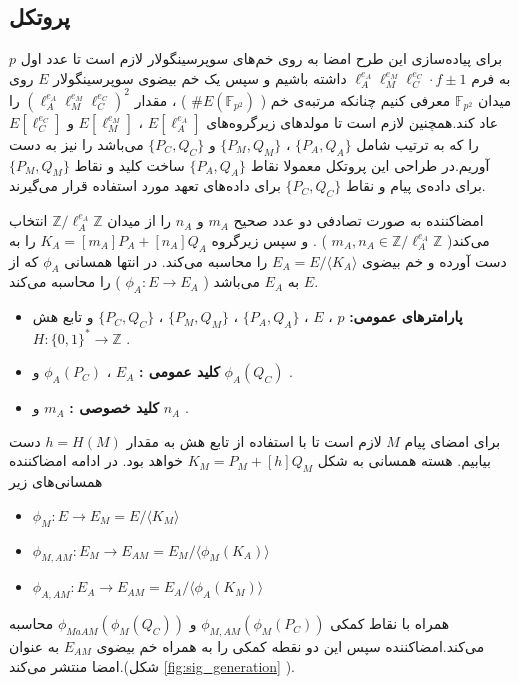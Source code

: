 \documentclass[12pt,a4paper]{article}
\begin{document}
\subsection{پروتکل}

برای پیاده‌سازی این طرح امضا به روی خم‌های سوپرسینگولار لازم است تا عدد اول 
$p$
 به فرم 
 $\ell_A^{e_A} \ell_M^{e_M} \ell_C^{e_C} \cdot f \pm 1$
داشته باشیم و سپس یک خم بیضوی سوپرسینگولار 
$E$
روی میدان
$\mathbb{F}_{p^2}$
معرفی کنیم چنانکه مرتبه‌ی خم (
$\# E(\mathbb{F}_{p^2})$
)
، مقدار
$(\ell_A^{e_A} \ell_M^{e_M} \ell_C^{e_C})^2$
را عاد کند.همچنین لازم است تا مولدهای زیرگروه‌های 
$E[\ell_A^{e_A}]$
،
$E[\ell_M^{e_M}]$
و
$E[\ell_C^{e_C}]$
را که به ترتیب شامل
$\{ P_A,Q_A\}$
،
$\{P_M,Q_M\}$
و
$\{P_C,Q_C\}$
می‌باشد را نیز به دست آوریم.در طراحی این پروتکل معمولا نقاط
$\{ P_A,Q_A\}$
ساخت کلید و نقاط
$\{P_M,Q_M\}$
برای داده‌ی پیام و نقاط
$\{P_C,Q_C\}$
برای داده‌های تعهد مورد استفاده قرار می‌گیرند.

امضاکننده به صورت تصادفی دو عدد صحیح
$m_A$
و
$n_A$
را از میدان
$\mathbb{Z} / \ell_A^{e_A} \mathbb{Z}$
انتخاب می‌کند(
$m_A,n_A \in \mathbb{Z} / \ell_A^{e_A} \mathbb{Z}$
)
. و سپس زیرگروه
$K_A = [m_A]P_A + [n_A]Q_A$
را به دست آورده و خم بیضوی
$E_A = E/ \langle K_A \rangle$
را محاسبه می‌کند. در انتها همسانی
$\phi_A$
که از
$E$
به
$E_A$
می‌باشد (
$ \phi_A : E \rightarrow E_A $
) را محاسبه می‌کند.
\begin{itemize}
	\item[]{\bf پارامترهای عمومی:}
	$p$
	،
	$E$
	،
	$\{ P_A,Q_A\}$
	،
	$\{P_M,Q_M\}$
	،
	$\{P_C,Q_C\}$
	و  تابع هش 
	$H : \{0,1\}^* \rightarrow \mathbb{Z}$
	.
	\item[]{\bf کلید عمومی :  }
	$E_A$
	،
	$\phi_A(P_C)$
	و
	$\phi_A(Q_C)$
	.
	\item[]{\bf کلید خصوصی :   }
	$m_A$
	و
	$n_A$
	.
\end{itemize}

برای امضای پیام
$M$
لازم است تا با استفاده از تابع هش به مقدار
$h = H(M)$
دست بیابیم. هسته همسانی به شکل
$K_M  = P_M + [h]Q_M$
خواهد بود. در ادامه امضاکننده همسانی‌های زیر 

\begin{itemize}
	
	\item 
	$\phi_M : E \rightarrow E_M = E / \langle K_M \rangle $
	
	\item 
	$\phi_{M,AM} : E_M \rightarrow E_{AM} = E_M / \langle \phi_{M}(K_A) \rangle$
	
	\item 
	$\phi_{A,AM} : E_A \rightarrow E_{AM} = E_A / \langle \phi_A(K_M) \rangle $
\end{itemize}
همراه با نقاط کمکی 
$\phi_{M,AM}(\phi_M(P_C))$
و
$\phi_{MaAM}(\phi_M(Q_C))$
محاسبه می‌کند.امضاکننده سپس این دو نقطه کمکی را به همراه خم بیضوی
$E_{AM}$
به عنوان امضا منتشر می‌کند.(شکل 
\ref{fig:sig_generation}
).
\end{document}
